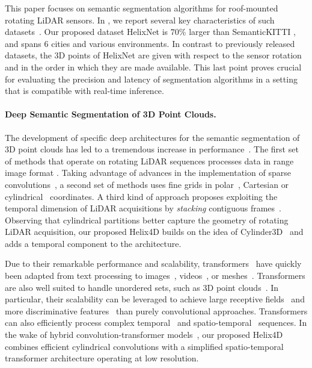 \documentclass[runningheads]{tpls/llncs}
\begin{document}
This paper focuses on semantic segmentation algorithms for roof-mounted rotating LiDAR sensors. In , we report several key characteristics of such datasets~\cite{jiang2021rellis,Geiger2013IJRR,behley2019iccv,Liao2021ARXIV,geyer2020a2d2,roynard2017parislille3d,tan2020toronto}.
Our proposed dataset HelixNet is $70$\% larger than SemanticKITTI \cite{Geiger2013IJRR,behley2019iccv}, and spans $6$ cities and various environments.
In contrast to previously released datasets, the 3D points of HelixNet are given with respect to the sensor rotation and in the order in which they are made available. This last point proves crucial for evaluating the precision and latency of segmentation algorithms in a setting that is compatible with real-time inference.

\paragraph{Deep Semantic Segmentation of 3D Point Clouds.}
The development of specific deep architectures for the semantic segmentation of 3D point clouds has led to a tremendous increase in performance~\cite{guo2020deep}. 
The first set of methods that operate on rotating LiDAR sequences processes data in range image format \cite{Liang_2021_CVPR,Sun_2021_CVPR,cortinhal2020salsanext}.
Taking advantage of advances in the implementation of sparse convolutions~\cite{SubmanifoldSparseConvNet,choy20194d}, a second set of methods uses fine grids in polar~\cite{Zhang_2020_CVPR}, Cartesian \cite{tang2020searching,cheng20212} or cylindrical~\cite{zhu2021cylindrical,Hong_2021_CVPR} coordinates. A third kind of approach proposes exploiting the temporal dimension of LiDAR acquisitions by \emph{stacking} contiguous frames~\cite{choy20194d,aygun20214d}. Observing that cylindrical partitions better capture the geometry of rotating LiDAR acquisition, our proposed Helix4D builds on the idea of Cylinder3D~\cite{zhu2021cylindrical} and adds a temporal component to the architecture.

Due to their remarkable performance and scalability, transformers~\cite{NIPS2017_3f5ee243} have quickly been adapted from text processing to images~\cite{dosovitskiy2020image,Liu_2021_ICCV,Strudel_2021_ICCV,carion2020end}, videos~\cite{Arnab_2021_ICCV}, or meshes~\cite{lin2021end}. Transformers are also well suited to handle unordered sets, such as 3D point clouds~\cite{guo2021pct,zhao2021point}. In particular, their scalability can be leveraged to achieve large receptive fields~\cite{Mao_2021_ICCV,pan20213d} and more discriminative features~\cite{bhattacharyya2021self} than purely convolutional approaches. Transformers can also efficiently process complex temporal~\cite{katharopoulos_et_al_2020,vyas_et_al_2020} and spatio-temporal~\cite{fan2021point} sequences. In the wake of hybrid convolution-transformer models~\cite{guo2021cmt,coccomini2021combining,d2021convit}, our proposed Helix4D combines efficient cylindrical convolutions with a simplified spatio-temporal transformer architecture operating at low resolution.
\end{document}
